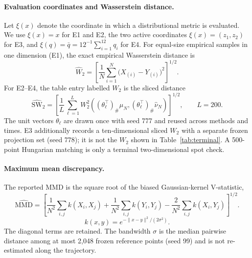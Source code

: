 \documentclass[11pt]{article}
\begin{document}
\paragraph{Evaluation coordinates and Wasserstein distance.}
Let $\xi(x)$ denote the coordinate in which a distributional metric is
evaluated.  We use $\xi(x)=x$ for E1 and E2, the two active coordinates
$\xi(x)=(z_1,z_2)$ for E3, and
$\xi(q)=\bar q=12^{-1}\sum_{i=1}^{12}q_i$ for E4.  For equal-size empirical
samples in one dimension (E1), the exact empirical Wasserstein distance is
\begin{equation}
 \widehat W_2
 =\left[\frac1N\sum_{i=1}^N
       \bigl(X_{(i)}-Y_{(i)}\bigr)^2\right]^{1/2}.
\end{equation}
For E2--E4, the table entry labelled $W_2$ is the sliced distance
\begin{equation}
 \widehat{\mathrm{SW}}_2
 =\left[
   \frac1L\sum_{\ell=1}^{L}
   W_2^2\!\left(
     (\theta_\ell^\top)_\#\widehat\mu_N,
     (\theta_\ell^\top)_\#\widehat\nu_N
   \right)\right]^{1/2},
 \qquad L=200 .
\end{equation}
The unit vectors $\theta_\ell$ are drawn once with seed 777 and reused across
methods and times.  E3 additionally records a ten-dimensional sliced $W_2$
with a separate frozen projection set (seed 778); it is not the $W_2$ shown in
Table~\ref{tab:terminal}.  A 500-point Hungarian matching is only a terminal
two-dimensional spot check.

\paragraph{Maximum mean discrepancy.}
The reported MMD is the square root of the biased Gaussian-kernel
V-statistic,
\begin{equation}
 \widehat{\mathrm{MMD}}
 =\left[
   \frac1{N^2}\sum_{i,j}k(X_i,X_j)
 +\frac1{N^2}\sum_{i,j}k(Y_i,Y_j)
  -\frac2{N^2}\sum_{i,j}k(X_i,Y_j)
 \right]^{1/2}.
\end{equation}
\begin{equation}
 k(x,y)=e^{-\lVert x-y\rVert^2/(2\sigma^2)} .
\end{equation}
The diagonal terms are retained.  The bandwidth $\sigma$ is the median
pairwise distance among at most 2,048 frozen reference points (seed 99) and is
not re-estimated along the trajectory.
\end{document}

